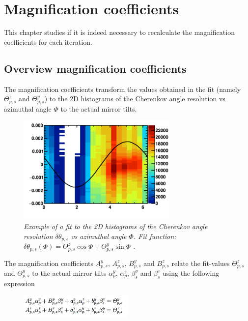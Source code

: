 \chapter{Magnification coefficients}
This chapter studies if it is indeed necessary to recalculate the magnification coefficients for each iteration.\\

\section{Overview magnification coefficients}
The magnification coefficients transform the values obtained in the fit (namely $\Theta^z_{p,s} $ and $\Theta^y_{p,s} $) to the 2D histograms of the Cherenkov angle resolution vs azimuthal angle $\Phi$ to the actual mirror tilts.\\
\begin{figure}[!ht]
	\vspace*{-0.cm}
	\begin{center}
		\includegraphics[width=0.7\textwidth]{dThetavphiRec4731.png}
		\vspace*{-1.cm}
	\end{center}
	\caption{\textit{Example of a fit to the 2D histograms of the Cherenkov angle resolution $\delta \theta_{p,s}$ vs azimuthal angle $\Phi$. Fit function: $\delta \theta_{p,s}(\Phi) = \Theta^z_{p,s} \cos\Phi + \Theta^y_{p,s} \sin\Phi$ .} }
	\label{fig:fitfunc}
\end{figure}
The magnification coefficients $A^y_{p,s}$, $A^z_{p,s}$, $B^y_{p,s}$ and $B^z_{p,s}$ relate the fit-values $\Theta^z_{p,s} $ and $\Theta^y_{p,s} $ to the actual mirror tilts $\alpha^y_p$, $\alpha^z_p$, $\beta^y_s$ and $\beta^z_s$ using the following expression\\
\begin{figure}[!ht]
	\vspace*{-0.cm}
	\begin{center}
		\includegraphics[width=0.5\textwidth]{magformular.png}
		\vspace*{-1.cm}
	\end{center}
\end{figure}
